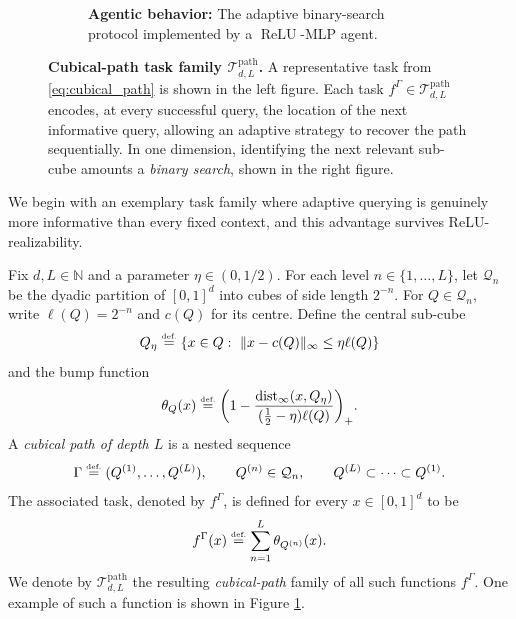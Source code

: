 \documentclass{article}
\newcommand{\eqdef }{\ensuremath{\stackrel{\mbox{\upshape\tiny def.}}{=}}}
\begin{document}
\begin{figure}[hb!]
\begin{subfigure}[t]{0.48\textwidth}
    \caption{\textbf{Agentic behavior:} The adaptive binary-search protocol implemented by a $\operatorname{ReLU}$-MLP agent.}
    \end{subfigure}
    \caption{\textbf{Cubical-path task family $\mathcal{T}_{d,L}^{\operatorname{path}}$.}
    A representative task from \eqref{eq:cubical_path} is shown in the left figure. Each task $f^\Gamma\in \mathcal{T}_{d,L}^{\operatorname{path}}$ encodes, at every successful query, the location of the next informative query, %
    allowing an adaptive strategy to recover the path sequentially.
    In one dimension, identifying the next relevant sub-cube amounts %
    a \textit{binary search}, shown in the right figure. %
    }
    \label{fig:dyadic}
\end{figure}





We begin with an exemplary task family where adaptive querying is genuinely more informative than every fixed context, and
this advantage survives %
ReLU-realizability.

Fix $d,L\in\mathbb N$ and a parameter $\eta\in(0,1/2)$. For each level
$n\in\{1,\dots,L\}$, let $\mathcal Q_n$ be the dyadic partition of $[0,1]^d$ into cubes of side
length $2^{-n}$. For $Q\in\mathcal Q_n$, write $\ell(Q)=2^{-n}$ and $c(Q)$ for its centre. Define
the central sub-cube
\begin{equation} \label{centralcube}
    Q_\eta\eqdef  \{x\in Q:\ \|x-c(Q)\|_\infty\le \eta\ell(Q)\}
\end{equation}
and the bump function
\[
    \theta_Q(x)
    \eqdef 
    \bigg(1-\frac{\operatorname{dist}_\infty(x,Q_\eta)}{(\tfrac12-\eta)\ell(Q)}\bigg)_+.
\]
A \emph{cubical path of depth $L$} is a nested sequence
\[
\Gamma \eqdef (Q^{(1)},\dots,Q^{(L)}),
\qquad
Q^{(n)}\in\mathcal Q_n,
\qquad
Q^{(L)}\subset\cdots\subset Q^{(1)}.
\]
The associated task, denoted by $f^\Gamma$, is defined for every $x\in [0,1]^d$ to be
\begin{equation}
\label{eq:cubical_path}
f^\Gamma(x)\eqdef  \sum_{n=1}^L \theta_{Q^{(n)}}(x). %
\end{equation}
We denote by $\mathcal{T}_{d,L}^{\mathrm{path}}$ the resulting \emph{cubical-path} family of all such functions $f^{\Gamma}$. 
One example of such a function is shown in Figure \ref{fig:dyadic}.
\end{document}
